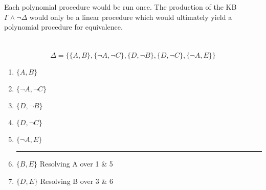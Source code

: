 \documentclass{article}
\begin{document}
 Each polynomial procedure would be run once. The production of the KB $\Gamma \land \lnot \Delta$ would only be a linear procedure which would ultimately yield a polynomial procedure for equivalence.
 
 \clearpage
 \section{}
 \[\Delta = \{\{A, B\}, \{\lnot A, \lnot C\}, \{D, \lnot B \}, \{D, \lnot C \}, \{\lnot A, E\}\}\]
  \renewcommand{\labelenumi}{\arabic{enumi}.}
 \begin{enumerate}
 \item $\{A, B\}$
 \item $\{\lnot A, \lnot C\}$
 \item $\{D, \lnot B \}$
 \item $\{D, \lnot C \}$
 \item $\{\lnot A, E \}$
 \newline
 \noindent\rule{4cm}{0.4pt}
 \item $\{B, E \}$ \quad Resolving A over 1 \& 5
 \item $\{D, E \}$ \quad Resolving B over 3 \& 6
 \end{enumerate}
 
 \clearpage
\end{document}
